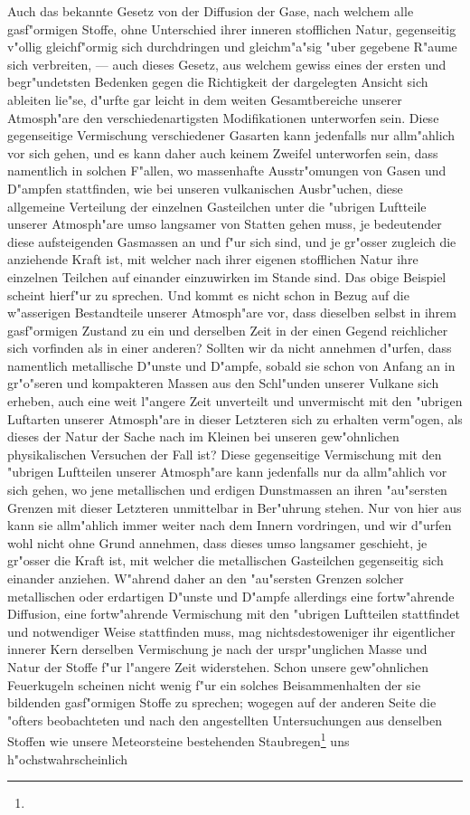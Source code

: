 \documentclass[a4paper, 8pt, oneside, polutonikogreek, german]{article}
\begin{document}
Auch das bekannte Gesetz von der Diffusion der Gase, nach welchem alle gasf"ormigen Stoffe, ohne Unterschied ihrer inneren stofflichen Natur, gegenseitig v"ollig gleichf"ormig sich durchdringen und gleichm"a"sig "uber gegebene R"aume sich verbreiten, --- auch dieses Gesetz, aus welchem gewiss eines der ersten und begr"undetsten Bedenken gegen die Richtigkeit der dargelegten Ansicht sich ableiten lie"se, d"urfte gar leicht in dem weiten Gesamtbereiche unserer Atmosph"are den verschiedenartigsten Modifikationen unterworfen sein. Diese gegenseitige Vermischung verschiedener Gasarten kann jedenfalls nur allm"ahlich vor sich gehen, und es kann daher auch keinem Zweifel unterworfen sein, dass namentlich in solchen F"allen, wo massenhafte Ausstr"omungen von Gasen und D"ampfen stattfinden, wie bei unseren vulkanischen Ausbr"uchen, diese allgemeine Verteilung der einzelnen Gasteilchen unter die "ubrigen Luftteile unserer Atmosph"are umso langsamer von Statten gehen muss, je bedeutender diese aufsteigenden Gasmassen an und f"ur sich sind, und je gr"osser zugleich die anziehende Kraft ist, mit welcher nach ihrer eigenen stofflichen Natur ihre einzelnen Teilchen auf einander einzuwirken im Stande sind. Das obige Beispiel scheint hierf"ur zu sprechen. Und kommt es nicht schon in Bezug auf die w"asserigen Bestandteile unserer Atmosph"are vor, dass dieselben selbst in ihrem gasf"ormigen Zustand zu ein und derselben Zeit in der einen Gegend reichlicher sich vorfinden als in einer anderen? Sollten wir da nicht annehmen d"urfen, dass namentlich metallische D"unste und D"ampfe, sobald sie schon von Anfang an in gr"o"seren und kompakteren Massen aus den Schl"unden unserer Vulkane sich erheben, auch eine weit l"angere Zeit unverteilt und unvermischt mit den "ubrigen Luftarten unserer Atmosph"are in dieser Letzteren sich zu erhalten verm"ogen, als dieses der Natur der Sache nach im Kleinen bei unseren gew"ohnlichen physikalischen Versuchen der Fall ist? Diese gegenseitige Vermischung mit den "ubrigen Luftteilen unserer Atmosph"are kann jedenfalls nur da allm"ahlich vor sich gehen, wo jene metallischen und erdigen Dunstmassen an ihren "au"sersten Grenzen mit dieser Letzteren unmittelbar in Ber"uhrung stehen. Nur von hier aus kann sie allm"ahlich immer weiter nach dem Innern vordringen, und wir d"urfen wohl nicht ohne Grund annehmen, dass dieses umso langsamer geschieht, je gr"osser die Kraft ist, mit welcher die metallischen Gasteilchen gegenseitig sich einander anziehen. W"ahrend daher an den "au"sersten Grenzen solcher metallischen oder erdartigen D"unste und D"ampfe allerdings eine fortw"ahrende Diffusion, eine fortw"ahrende Vermischung mit den "ubrigen Luftteilen stattfindet und notwendiger Weise stattfinden muss, mag nichtsdestoweniger ihr eigentlicher innerer Kern derselben Vermischung je nach der urspr"unglichen Masse und Natur der Stoffe f"ur l"angere Zeit widerstehen. Schon unsere gew"ohnlichen Feuerkugeln scheinen nicht wenig f"ur ein solches Beisammenhalten der sie bildenden gasf"ormigen Stoffe zu sprechen; wogegen auf der anderen Seite die "ofters beobachteten und nach den angestellten Untersuchungen aus denselben Stoffen wie unsere Meteorsteine bestehenden Staubregen\footnote{} uns h"ochstwahrscheinlich 
\end{document}
